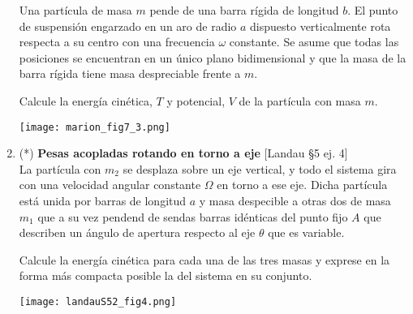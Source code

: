 \documentclass[11pt, spanish, a4paper, twoside]{article}
\begin{document}
\begin{enumerate}
\begin{minipage}[t][7.1cm]{0.5\textwidth}
		Una partícula de masa \(m\) pende de una barra rígida de longitud \(b\).
		El punto de suspensión engarzado en un aro de radio \(a\) dispuesto verticalmente rota respecta a su centro con una frecuencia \(\omega\) constante.
		Se asume que todas las posiciones se encuentran en un único plano bidimensional y que la masa de la barra rígida tiene masa despreciable frente a \(m\).

		Calcule la energía cinética, \(T\) y potencial, \(V\) de la partícula con masa \(m\).\end{minipage}
	\begin{minipage}[c][3cm][t]{0.5\textwidth}
		\texttt{[image: marion\_fig7\_3.png]}
	\end{minipage}



\item
	\begin{minipage}[t][4.5cm]{0.65\textwidth}
		(*) \textbf{Pesas acopladas rotando en torno a eje} [Landau \S5 ej. 4]\\

		La partícula con \(m_2\) se desplaza sobre un eje vertical, y todo el sistema gira con una velocidad angular constante \(\Omega\) en torno a ese eje.
		Dicha partícula está unida por barras de longitud \(a\) y masa despecible a otras dos de masa \(m_1\) que a su vez pendend de sendas barras idénticas del punto fijo \(A\) que describen un ángulo de apertura respecto al eje \(\theta\) que es variable.

			Calcule la energía cinética para cada una de las tres masas y exprese en la forma más compacta posible la del sistema en su conjunto.
	\end{minipage}
	\begin{minipage}[c][1cm][t]{0.35\textwidth}
		\texttt{[image: landauS52\_fig4.png]}
	\end{minipage}



\end{enumerate}
\end{document}

